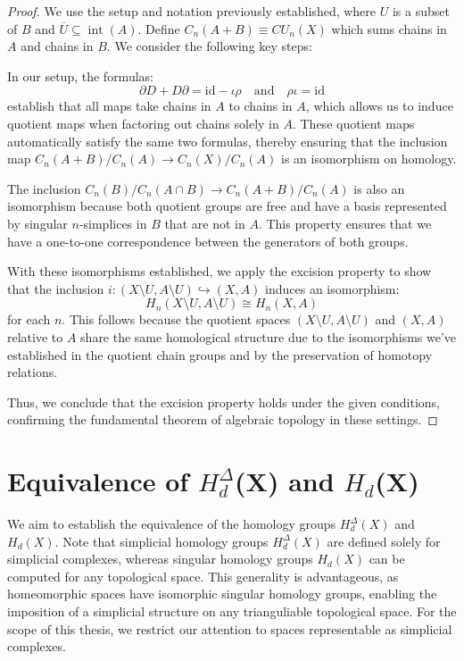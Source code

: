 \begin{proof}
	We use the setup and notation previously established, where $U$ is a subset of
	$B$ and $\overline{U}\subseteq \operatorname{int}(A)$. Define $C_{n}(A + B) \equiv
	CU_{n}(X)$ which sums chains in $A$ and chains in $B$. We consider the
	following key steps:

	In our setup, the formulas:
	\[
		\partial D + D \partial = \text{id}- \iota \rho \quad \text{and}\quad \rho \iota
		= \text{id}
	\]
	establish that all maps take chains in $A$ to chains in $A$, which allows us to
	induce quotient maps when factoring out chains solely in $A$. These quotient
	maps automatically satisfy the same two formulas, thereby ensuring that the inclusion
	map $C_{n}(A + B)/C_{n}(A) \to C_{n}(X)/C_{n}(A)$ is an isomorphism on homology.

	The inclusion $C_{n}(B)/C_{n}(A \cap B) \to C_{n}(A + B)/C_{n}(A)$ is also an isomorphism
	because both quotient groups are free and have a basis represented by singular
	$n$-simplices in $B$ that are not in $A$. This property ensures that we have a
	one-to-one correspondence between the generators of both groups.

	With these isomorphisms established, we apply the excision property to show that
	the inclusion $i: (X \setminus U, A \setminus U) \hookrightarrow (X, A)$ induces
	an isomorphism:
	\[
		H_{n}(X \setminus U, A \setminus U) \cong H_{n}(X, A)
	\]
	for each $n$. This follows because the quotient spaces $(X \setminus U, A \setminus
	U)$ and $(X, A)$ relative to $A$ share the same homological structure due to the
	isomorphisms we've established in the quotient chain groups and by the preservation
	of homotopy relations.

	Thus, we conclude that the excision property holds under the given conditions,
	confirming the fundamental theorem of algebraic topology in these settings.
\end{proof}

\section{Equivalence of $H_{d}^{\Delta}$(X) and $H_{d}$(X)}
We aim to establish the equivalence of the homology groups $H^{\Delta}_{d}(X)$
and $H_{d}(X)$. Note that simplicial homology groups $H^{\Delta}_{d}(X)$ are defined
solely for simplicial complexes, whereas singular homology groups $H_{d}(X)$ can
be computed for any topological space. This generality is advantageous, as
homeomorphic spaces have isomorphic singular homology groups, enabling the imposition
of a simplicial structure on any trianguliable topological space. For the scope
of this thesis, we restrict our attention to spaces representable as simplicial complexes.

